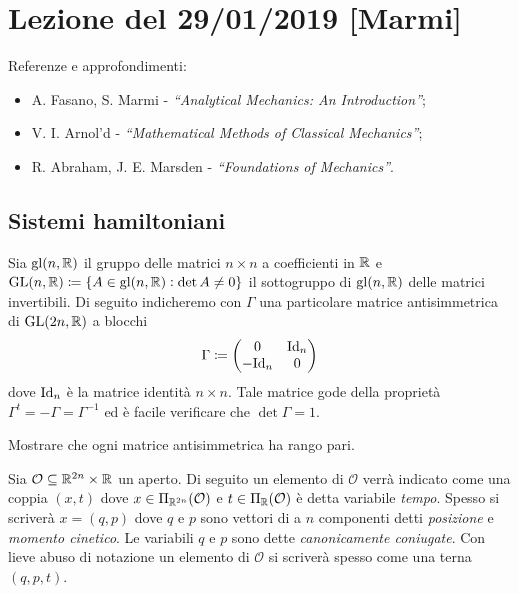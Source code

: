\section{Lezione del 29/01/2019 [Marmi]}
Referenze e approfondimenti:
\begin{itemize}
    \item A. Fasano, S. Marmi - \emph{``Analytical Mechanics: An Introduction''};
    \item V. I. Arnol'd - \emph{``Mathematical Methods of Classical Mechanics''};
    \item R. Abraham, J. E. Marsden - \emph{``Foundations of Mechanics''}.
\end{itemize}

\subsection{Sistemi hamiltoniani}
Sia $ \mathrm{gl}(n, \mathbb{R}) $ il gruppo delle matrici $ n \times n $ a coefficienti in $ \mathbb{R} $ e $ {\mathrm{GL}(n, \mathbb{R}) \coloneqq \{A \in \mathrm{gl}(n, \mathbb{R}) : \det{A} \neq 0\}} $ il sottogruppo di $ \mathrm{gl}(n, \mathbb{R}) $ delle matrici invertibili. Di seguito indicheremo con $ \Gamma $ una particolare matrice antisimmetrica di $ \mathrm{GL}(2n, \mathbb{R}) $ a blocchi
\begin{equation}
    \Gamma \coloneqq
    \begin{pmatrix}
        0 & \mathrm{Id}_{n} \\
        -\mathrm{Id}_{n} & 0 \\
    \end{pmatrix}
\end{equation}
dove $ \mathrm{Id}_n $ è la matrice identità $ n \times n $. Tale matrice gode della proprietà $ \Gamma^t = -\Gamma = \Gamma^{-1} $ ed è facile verificare che $ \det{\Gamma} = 1 $. \\

\begin{exercise}
    Mostrare che ogni matrice antisimmetrica ha rango pari.
\end{exercise}

Sia $ \mathcal{O} \subseteq \mathbb{R}^{2n} \times \mathbb{R} $ un aperto. Di seguito un elemento di $ \mathcal{O} $ verrà indicato come una coppia $ (x, t) $ dove $ x \in \Pi_{\mathbb{R}^{2n}}(\mathcal{O}) $ e $ t \in \Pi_{\mathbb{R}}(\mathcal{O}) $ è detta variabile \emph{tempo}. Spesso si scriverà $ x = (q, p) $ dove $ q $ e $ p $ sono vettori di a $ n $ componenti detti \emph{posizione} e \emph{momento cinetico}. Le variabili $ q $ e $ p $ sono dette \emph{canonicamente coniugate}. Con lieve abuso di notazione un elemento di $ \mathcal{O} $ si scriverà spesso come una terna $ (q, p, t) $. \\

